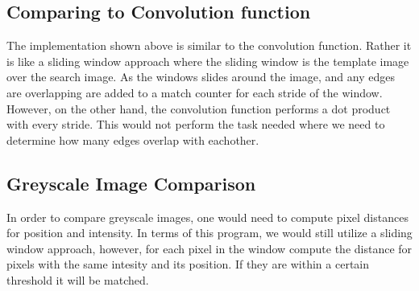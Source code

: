 \documentclass[12p,letterpaper]{article}
\begin{document}
		\subsection{Comparing to Convolution function}
			\quad The implementation shown above is similar to the convolution function. Rather 
			it is like a sliding window approach where the sliding window is the template image 
			over the search image. As the windows slides around the image, and any edges are
			overlapping are added to a match counter for each stride of the window. However,
			on the other hand, the convolution function performs a dot product with every stride.
			This would not perform the task needed where we need to determine how many edges 
			overlap with eachother. 

		\subsection{Greyscale Image Comparison}

			In order to compare greyscale images, one would need to compute pixel distances for position
			and intensity. In terms of this program, we would still utilize a sliding window approach, however,
			for each pixel in the window compute the distance for pixels with the same intesity and its position. 
			If they are within a certain threshold it will be matched. 
\end{document}
